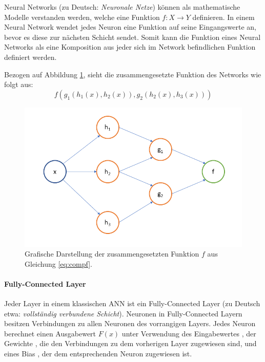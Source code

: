 Neural Networks (zu Deutsch: \textit{Neuronale Netze}) können als mathematische Modelle verstanden werden, welche eine Funktion $f : X \rightarrow Y$ definieren. In einem Neural Network wendet jedes Neuron eine Funktion auf seine Eingangswerte an, bevor es diese zur nächsten Schicht sendet. Somit kann die Funktion eines Neural Networks als eine Komposition aus jeder sich im Network befindlichen Funktion definiert werden. 

Bezogen auf Abbildung \ref{fig:composedGraph}, sieht die zusammengesetzte Funktion des Networks wie folgt aus: 
\begin{equation}
\label{eq:compf}
f(g_1(h_1(x), h_2(x)),g_2(h_2(x), h_3(x)))
\end{equation}

\begin{figure}[ht]
\centering
\includegraphics[scale=0.4]{pictures/grafiken/Folie4}
\caption[Caption for LOF]{Grafische Darstellung der zusammengesetzten Funktion $f$ aus Gleichung \ref{eq:compf}.}
\label{fig:composedGraph}

\end{figure}

\paragraph{Fully-Connected Layer}
Jeder Layer in einem klassischen ANN ist ein Fully-Connected Layer (zu Deutsch etwa: \textit{vollständig verbundene Schicht}). Neuronen in Fully-Connected Layern besitzen Verbindungen zu allen Neuronen des vorrangigen Layers. Jedes Neuron berechnet einen Ausgabewert $F(x)$ unter Verwendung des Eingabewertes , der Gewichte , die den Verbindungen zu dem vorherigen Layer zugewiesen sind, und eines Bias , der dem entsprechenden Neuron zugewiesen ist. 

